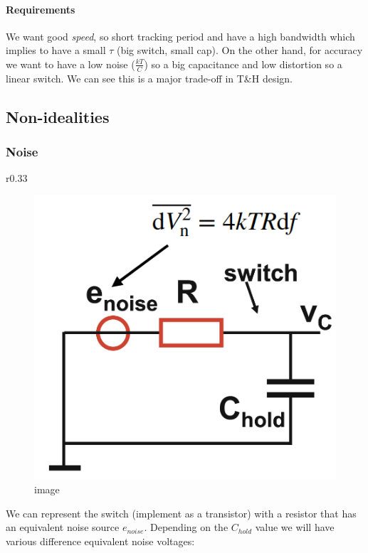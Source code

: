 \documentclass[
  a4paper,
]{article}
\begin{document}
\hypertarget{requirements}{%
\paragraph{Requirements}\label{requirements}}

We want good \emph{speed}, so short tracking period and have a high
bandwidth which implies to have a small \(\tau\) (big switch, small
cap). On the other hand, for accuracy we want to have a low noise
(\(\frac{kT}{C}\)) so a big capacitance and low distortion so a linear
switch. We can see this is a major trade-off in T\&H design.

\hypertarget{non-idealities}{%
\subsection{Non-idealities}\label{non-idealities}}

\hypertarget{noise}{%
\subsubsection{Noise}\label{noise}}

r0.33

\begin{figure}
\centering
\includegraphics{img/noise_sampling_switch.png}
\caption{image}
\end{figure}

We can represent the switch (implement as a transistor) with a resistor
that has an equivalent noise source \(e_{noise}\). Depending on the
\(C_{hold}\) value we will have various difference equivalent noise
voltages:
\end{document}
